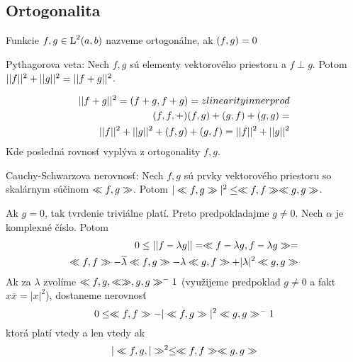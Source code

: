 
\subsection{Ortogonalita}
\begin{definicia}
 Funkcie $f,g \in \mbox{L}^2(a,b)$ nazveme ortogonálne, ak
 $( f,g )=0$
\end{definicia}


\begin{lema}
    Pythagorova veta:
    Nech $f,g$ sú elementy vektorového priestoru a
    $f\perp g$.
    Potom $||f||^2 + ||g||^2 = ||f+g||^2$.
\end{lema}
\begin{dokaz}
    \begin{align}
        ||f+g||^2 = ( f+g,f+g ) =  z linearity inner prod\\
        ( f,f,+ ) ( f,g ) + ( g,f ) + ( g,g ) = \\
        ||f||^2 + ||g||^2 + ( f,g ) + ( g,f ) = 
        ||f||^2 + ||g||^2
    \end{align}
    Kde posledná rovnosť vyplýva z ortogonality $f,g$.
\end{dokaz}

\begin{veta}
    Cauchy-Schwarzova nerovnosť:
    Nech $f,g$ sú prvky vektorového priestoru so skalárnym súčinom
    $\ll f,g \gg$.
    Potom $|\ll f,g \gg|^2 \le \ll f,f \gg \ll g,g \gg$.
\end{veta}
\begin{dokaz}
    Ak $g=0$, tak tvrdenie triviálne platí. Preto predpokladajme
    $g\not=0$. Nech $\alpha$ je komplexné číslo. Potom
    \begin{align}
        0\le ||f-\lambda g|| = \ll f-\lambda g,f-\lambda g \gg =
        \\
        \ll f,f \gg - \overline{\lambda}\ll f,g \gg -
        \lambda \ll g,f \gg + |\lambda|^2 \ll g,g \gg
    \end{align}
    Ak za $\lambda$ zvolíme $\ll f,g,\ll \gg,g,g \gg^-1$ (využijeme
    predpoklad $g\not=0$ a fakt $x\overline{x} = |x|^2$), dostaneme nerovnosť
    \begin{equation}
        0\le \ll f,f \gg - |\ll f,g \gg|^2 \ll g,g \gg^-1
    \end{equation}
    ktorá platí vtedy a len vtedy ak
    \begin{equation}
        |\ll f,g,| \gg^2 \le \ll f,f \gg \ll g,g \gg
    \end{equation}
\end{dokaz}


